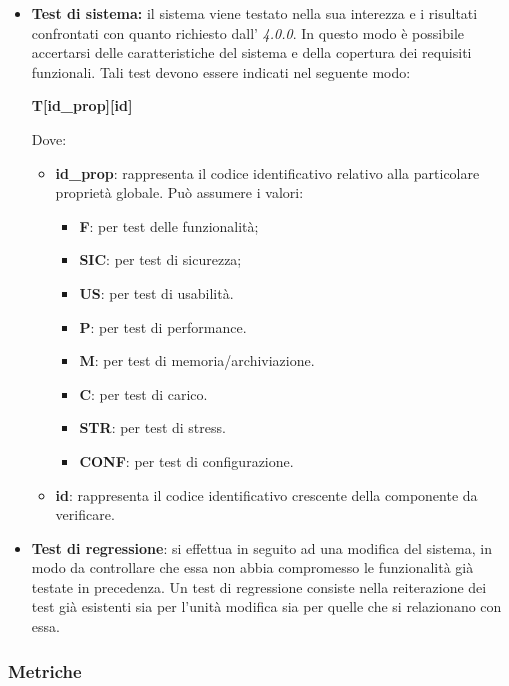 \begin{itemize}
			\item \textbf{Test di sistema:} il sistema viene testato nella sua interezza e i  risultati confrontati con quanto richiesto dall'\AdR{} \textit{4.0.0}. In questo modo è possibile accertarsi delle caratteristiche del sistema e della copertura dei requisiti funzionali. Tali test devono essere indicati nel seguente modo: 
			\begin{center}
				\textbf{T[id\_prop][id]}
			\end{center}
			Dove:
			\begin{itemize}
				\item \textbf{id\_prop}: rappresenta il codice identificativo relativo alla particolare proprietà globale. Può assumere i valori:
				\begin{itemize}
					\item{\textbf{F}: per test delle funzionalità;}
					\item{\textbf{SIC}: per test di sicurezza;}
					\item{\textbf{US}: per test di usabilità.}
					\item{\textbf{P}: per test di performance.}
					\item{\textbf{M}: per test di memoria/archiviazione.}
					\item{\textbf{C}: per test di carico.}
					\item{\textbf{STR}: per test di stress.}
					\item{\textbf{CONF}: per test di configurazione.}
				\end{itemize}
				\item \textbf{id}: rappresenta il codice identificativo crescente della componente da verificare.
			\end{itemize} 
         
          \item \textbf{Test di regressione}: si effettua in seguito ad una modifica del sistema, in modo da controllare che essa non abbia compromesso le funzionalità già testate in precedenza. Un test di regressione consiste nella reiterazione dei test già esistenti sia per l'unità modifica sia per quelle che si relazionano con essa.
        \end{itemize}

	\subsubsection{Metriche}
